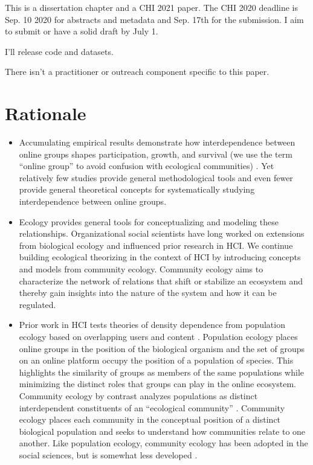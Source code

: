 \documentclass[12pt]{memoir}
\begin{document}
This is a dissertation chapter and a CHI 2021 paper. The CHI 2020 deadline is Sep. 10 2020 for abstracts and metadata and Sep. 17th for the submission. I aim to submit or have a solid draft by July 1.

I'll release code and datasets.

There isn't a practitioner or outreach component specific to this paper.

\section{Rationale}

\begin{itemize}
\item Accumulating empirical results demonstrate how interdependence between online groups shapes participation, growth, and survival (we use the term ``online group'' to avoid confusion with ecological communities) \citep[e.g.][]{vincent_examining_2018,chandrasekharan_you_2017,tan_all_2015,tan_tracing_2018}.   Yet relatively few studies provide general methodological tools and even fewer provide general theoretical concepts for systematically studying interdependence between online groups.

\item Ecology provides general tools for conceptualizing and modeling these relationships.  Organizational social scientists have long worked on extensions from biological ecology and influenced prior research in HCI.  We continue building ecological theorizing in the context of HCI by introducing concepts and models from community ecology.  Community ecology aims to characterize the network of relations that shift or stabilize an ecosystem and thereby gain insights into the nature of the system and how it can be regulated.  

\item Prior work in HCI tests theories of density dependence from population ecology based on overlapping users and content \citep{zhu_impact_2014,zhu_selecting_2014,wang_impact_2013}.  Population ecology places online groups in the position of the biological organism and the set of groups on an online platform occupy the position of a population of species.  This highlights the similarity of groups as members of the same populations while minimizing the distinct roles that groups can play in the online ecosystem.   Community ecology by contrast analyzes populations as distinct interdependent constituents of an ``ecological community'' \citep{astley_two_1985-1}.  Community ecology places each community in the conceptual position of a distinct biological population and seeks to understand how communities relate to one another.  Like population ecology, community ecology has been adopted in the social sciences, but is somewhat less developed \citep[e.g.][]{margolin_normative_2012,ruef_emergence_2000,powell_network_2005,mcpherson_testing_1996-1}. 


\end{itemize}
\end{document}
